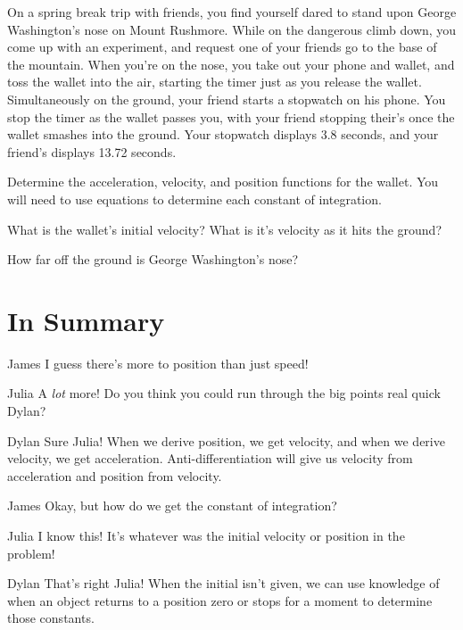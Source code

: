 \documentclass{ximera}
\begin{document}
\begin{question}
On a spring break trip with friends, you find yourself dared to stand upon George Washington's nose on Mount Rushmore. While on the dangerous climb down, you come up with an experiment, and request one of your friends go to the base of the mountain. When you're on the nose, you take out your phone and wallet, and toss the wallet into the air, starting the timer just as you release the wallet. Simultaneously on the ground, your friend starts a stopwatch on his phone. You stop the timer as the wallet passes you, with your friend stopping their's once the wallet smashes into the ground. Your stopwatch displays 3.8 seconds, and your friend's displays 13.72 seconds.

Determine the acceleration, velocity, and position functions for the wallet. You will need to use equations to determine each constant of integration.

What is the wallet's initial velocity? What is it's velocity as it hits the ground?

How far off the ground is George Washington's nose?
\end{question}

\section{In Summary}
\begin{dialogue}
\item[James] I guess there's more to position than just speed!
\item[Julia] A \textit{lot} more! Do you think you could run through the big points real quick Dylan?
\item[Dylan] Sure Julia! When we derive position, we get velocity, and when we derive velocity, we get acceleration. Anti-differentiation will give us velocity from acceleration and position from velocity.
\item[James] Okay, but how do we get the constant of integration?
\item[Julia] I know this! It's whatever was the initial velocity or position in the problem!
\item[Dylan] That's right Julia! When the initial isn't given, we can use knowledge of when an object returns to a position zero or stops for a moment to determine those constants.
\end{dialogue}
\end{document}
